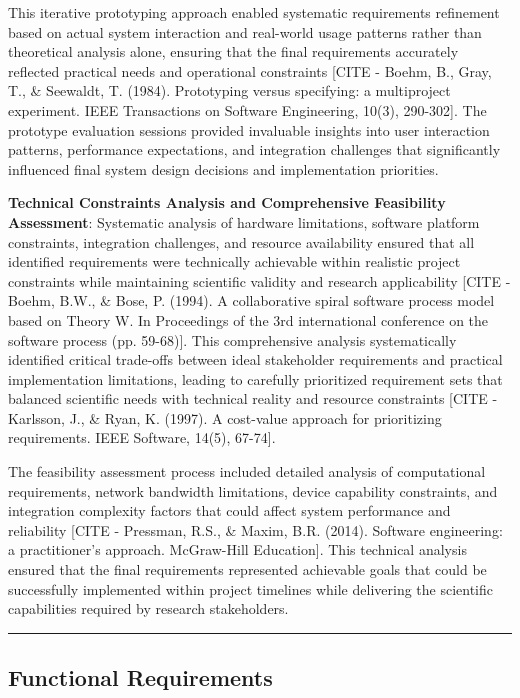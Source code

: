 \documentclass[12pt,a4paper]{report}
\begin{document}
This iterative prototyping approach enabled systematic requirements refinement based on actual system interaction and
real-world usage patterns rather than theoretical analysis alone, ensuring that the final requirements accurately
reflected practical needs and operational
constraints [CITE - Boehm, B., Gray, T., \& Seewaldt, T. (1984). Prototyping versus specifying: a multiproject experiment. IEEE Transactions on Software Engineering, 10(3), 290-302].
The prototype evaluation sessions provided invaluable insights into user interaction patterns, performance expectations,
and integration challenges that significantly influenced final system design decisions and implementation priorities.

\textbf{Technical Constraints Analysis and Comprehensive Feasibility Assessment}: Systematic analysis of hardware
limitations, software platform constraints, integration challenges, and resource availability ensured that all
identified requirements were technically achievable within realistic project constraints while maintaining scientific
validity and research
applicability [CITE - Boehm, B.W., \& Bose, P. (1994). A collaborative spiral software process model based on Theory W. In Proceedings of the 3rd international conference on the software process (pp. 59-68)].
This comprehensive analysis systematically identified critical trade-offs between ideal stakeholder requirements and
practical implementation limitations, leading to carefully prioritized requirement sets that balanced scientific needs
with technical reality and resource
constraints [CITE - Karlsson, J., \& Ryan, K. (1997). A cost-value approach for prioritizing requirements. IEEE Software, 14(5), 67-74].

The feasibility assessment process included detailed analysis of computational requirements, network bandwidth
limitations, device capability constraints, and integration complexity factors that could affect system performance and
reliability [CITE - Pressman, R.S., \& Maxim, B.R. (2014). Software engineering: a practitioner's approach. McGraw-Hill Education].
This technical analysis ensured that the final requirements represented achievable goals that could be successfully
implemented within project timelines while delivering the scientific capabilities required by research stakeholders.

\hrule

\subsection{Functional Requirements}
\end{document}
